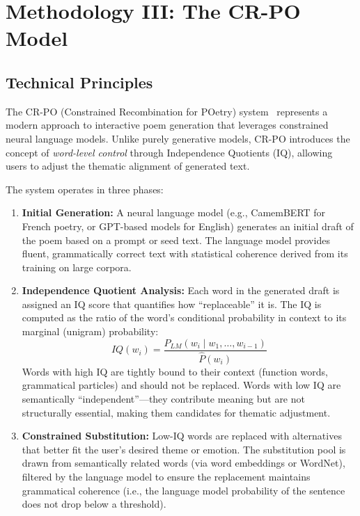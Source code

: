 \documentclass[conference]{IEEEtran}
\begin{document}
\section{Methodology III: The CR-PO Model}
\label{sec:crpo}

\subsection{Technical Principles}

The CR-PO (Constrained Recombination for POetry) system~\cite{popescu2022crpo} represents a modern approach to interactive poem generation that leverages constrained neural language models. Unlike purely generative models, CR-PO introduces the concept of \textit{word-level control} through Independence Quotients (IQ), allowing users to adjust the thematic alignment of generated text.

The system operates in three phases:

\begin{enumerate}
    \item \textbf{Initial Generation:} A neural language model (e.g., CamemBERT for French poetry, or GPT-based models for English) generates an initial draft of the poem based on a prompt or seed text. The language model provides fluent, grammatically correct text with statistical coherence derived from its training on large corpora.
    \item \textbf{Independence Quotient Analysis:} Each word in the generated draft is assigned an IQ score that quantifies how ``replaceable'' it is. The IQ is computed as the ratio of the word's conditional probability in context to its marginal (unigram) probability:
    \begin{equation}
        IQ(w_i) = \frac{P_{LM}(w_i \mid w_1, \ldots, w_{i-1})}{\hat{P}(w_i)}
    \end{equation}
    Words with high IQ are tightly bound to their context (function words, grammatical particles) and should not be replaced. Words with low IQ are semantically ``independent''---they contribute meaning but are not structurally essential, making them candidates for thematic adjustment.
    \item \textbf{Constrained Substitution:} Low-IQ words are replaced with alternatives that better fit the user's desired theme or emotion. The substitution pool is drawn from semantically related words (via word embeddings or WordNet), filtered by the language model to ensure the replacement maintains grammatical coherence (i.e., the language model probability of the sentence does not drop below a threshold).
\end{enumerate}
\end{document}
